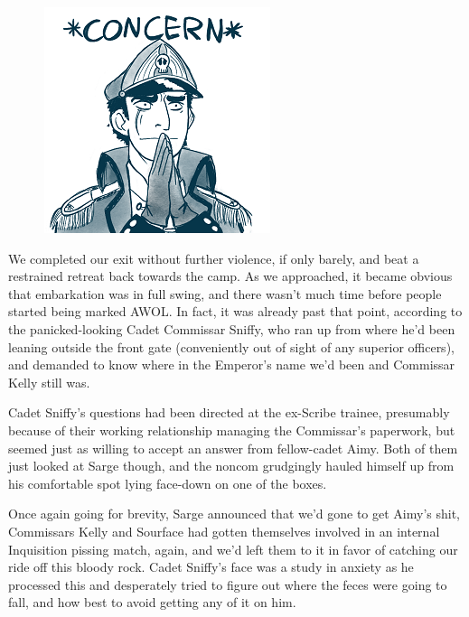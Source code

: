 \begin{figure}
	\begin{center}
		\includegraphics[width=\figwidth]{pics/21/115.png}
	\end{center}
\end{figure}
We completed our exit without further violence, if only barely, and beat a restrained retreat back towards the camp. 
As we approached, it became obvious that embarkation was in full swing, and there wasn't much time before people started being marked AWOL. 
In fact, it was already past that point, according to the panicked-looking Cadet Commissar Sniffy, who ran up from where he'd been leaning outside the front gate (conveniently out of sight of any superior officers), and demanded to know where in the Emperor's name we'd been and Commissar Kelly still was.

Cadet Sniffy's questions had been directed at the ex-Scribe trainee, presumably because of their working relationship managing the Commissar's paperwork, but seemed just as willing to accept an answer from fellow-cadet Aimy. 
Both of them just looked at Sarge though, and the noncom grudgingly hauled himself up from his comfortable spot lying face-down on one of the boxes. 


Once again going for brevity, Sarge announced that we'd gone to get Aimy's shit, Commissars Kelly and Sourface had gotten themselves involved in an internal Inquisition pissing match, again, and we'd left them to it in favor of catching our ride off this bloody rock. 
Cadet Sniffy's face was a study in anxiety as he processed this and desperately tried to figure out where the feces were going to fall, and how best to avoid getting any of it on him.

